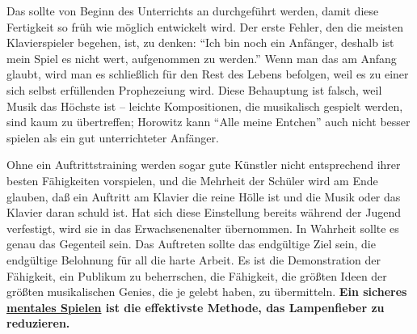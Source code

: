 Das sollte von Beginn des Unterrichts an durchgeführt werden, damit diese Fertigkeit so früh wie möglich entwickelt wird.
Der erste Fehler, den die meisten Klavierspieler begehen, ist, zu denken: \enquote{Ich bin noch ein Anfänger, deshalb ist mein Spiel es nicht wert, aufgenommen zu werden.}
Wenn man das am Anfang glaubt, wird man es schließlich für den Rest des Lebens befolgen, weil es zu einer sich selbst erfüllenden Prophezeiung wird.
Diese Behauptung ist falsch, weil Musik das Höchste ist -- leichte Kompositionen, die musikalisch gespielt werden, sind kaum zu übertreffen; Horowitz kann \enquote{Alle meine Entchen} auch nicht besser spielen als ein gut unterrichteter Anfänger.

Ohne ein Auftrittstraining werden sogar gute Künstler nicht entsprechend ihrer besten Fähigkeiten vorspielen, und die Mehrheit der Schüler wird am Ende glauben, daß ein Auftritt am Klavier die reine Hölle ist und die Musik oder das Klavier daran schuld ist.
Hat sich diese Einstellung bereits während der Jugend verfestigt, wird sie in das Erwachsenenalter übernommen.
In Wahrheit sollte es genau das Gegenteil sein.
Das Auftreten sollte das endgültige Ziel sein, die endgültige Belohnung für all die harte Arbeit.
Es ist die Demonstration der Fähigkeit, ein Publikum zu beherrschen, die Fähigkeit, die größten Ideen der größten musikalischen Genies, die je gelebt haben, zu übermitteln.
\textbf{Ein sicheres \hyperref[c1ii12mental]{mentales Spielen} ist die effektivste Methode, das Lampenfieber zu reduzieren.}

